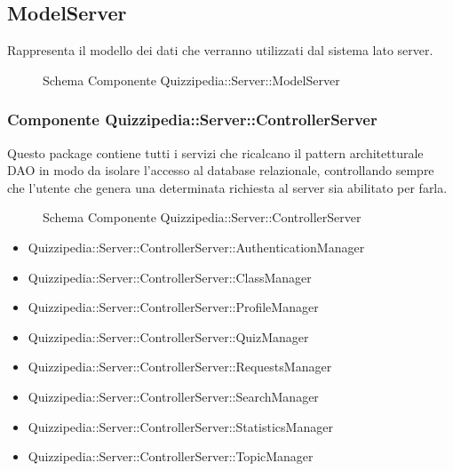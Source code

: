 \subsection{ModelServer}
Rappresenta il modello dei dati che verranno utilizzati dal sistema lato server.
\begin{figure}[H]
\centering
\noindent{}
\caption{Schema Componente Quizzipedia::Server::ModelServer}
\end{figure}
\subsubsection{Componente Quizzipedia::Server::ControllerServer}
Questo package contiene tutti i servizi che ricalcano il pattern architetturale DAO in modo da isolare l'accesso al database relazionale, controllando sempre che l'utente che genera una determinata richiesta al server sia abilitato per farla.
\begin{figure}[H]
\centering
\noindent{}
\caption{Schema Componente Quizzipedia::Server::ControllerServer}
\end{figure}
\begin{itemize}
\item Quizzipedia::Server::ControllerServer::AuthenticationManager
\item Quizzipedia::Server::ControllerServer::ClassManager
\item Quizzipedia::Server::ControllerServer::ProfileManager
\item Quizzipedia::Server::ControllerServer::QuizManager
\item Quizzipedia::Server::ControllerServer::RequestsManager
\item Quizzipedia::Server::ControllerServer::SearchManager
\item Quizzipedia::Server::ControllerServer::StatisticsManager
\item Quizzipedia::Server::ControllerServer::TopicManager
\end{itemize}
